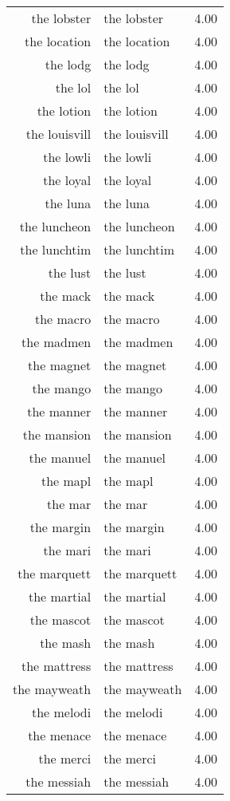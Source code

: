 \begin{table}[ht]
\begin{tabular}{rlr}
  the lobster & the lobster & 4.00 \\ 
  the location & the location & 4.00 \\ 
  the lodg & the lodg & 4.00 \\ 
  the lol & the lol & 4.00 \\ 
  the lotion & the lotion & 4.00 \\ 
  the louisvill & the louisvill & 4.00 \\ 
  the lowli & the lowli & 4.00 \\ 
  the loyal & the loyal & 4.00 \\ 
  the luna & the luna & 4.00 \\ 
  the luncheon & the luncheon & 4.00 \\ 
  the lunchtim & the lunchtim & 4.00 \\ 
  the lust & the lust & 4.00 \\ 
  the mack & the mack & 4.00 \\ 
  the macro & the macro & 4.00 \\ 
  the madmen & the madmen & 4.00 \\ 
  the magnet & the magnet & 4.00 \\ 
  the mango & the mango & 4.00 \\ 
  the manner & the manner & 4.00 \\ 
  the mansion & the mansion & 4.00 \\ 
  the manuel & the manuel & 4.00 \\ 
  the mapl & the mapl & 4.00 \\ 
  the mar & the mar & 4.00 \\ 
  the margin & the margin & 4.00 \\ 
  the mari & the mari & 4.00 \\ 
  the marquett & the marquett & 4.00 \\ 
  the martial & the martial & 4.00 \\ 
  the mascot & the mascot & 4.00 \\ 
  the mash & the mash & 4.00 \\ 
  the mattress & the mattress & 4.00 \\ 
  the mayweath & the mayweath & 4.00 \\ 
  the melodi & the melodi & 4.00 \\ 
  the menace & the menace & 4.00 \\ 
  the merci & the merci & 4.00 \\ 
  the messiah & the messiah & 4.00 \\ 

\end{tabular}
\end{table}
